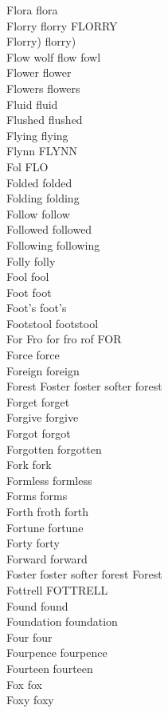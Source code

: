 Flora flora\\
Florry florry FLORRY\\
Florry) florry)\\
Flow wolf flow fowl\\
Flower flower\\
Flowers flowers\\
Fluid fluid\\
Flushed flushed\\
Flying flying\\
Flynn FLYNN\\
Fol FLO\\
Folded folded\\
Folding folding\\
Follow follow\\
Followed followed\\
Following following\\
Folly folly\\
Fool fool\\
Foot foot\\
Foot's foot's\\
Footstool footstool\\
For Fro for fro rof FOR\\
Force force\\
Foreign foreign\\
Forest Foster foster softer forest\\
Forget forget\\
Forgive forgive\\
Forgot forgot\\
Forgotten forgotten\\
Fork fork\\
Formless formless\\
Forms forms\\
Forth froth forth\\
Fortune fortune\\
Forty forty\\
Forward forward\\
Foster foster softer forest Forest\\
Fottrell FOTTRELL\\
Found found\\
Foundation foundation\\
Four four\\
Fourpence fourpence\\
Fourteen fourteen\\
Fox fox\\
Foxy foxy\\
